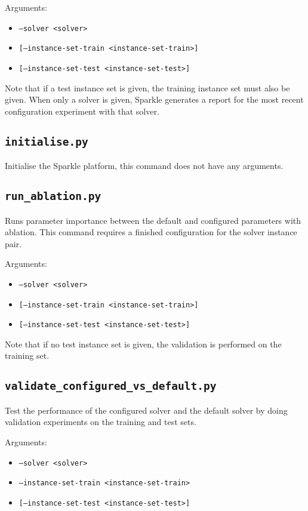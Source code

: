 \documentclass{article}
\begin{document}
Arguments:
\begin{itemize}[noitemsep]
  \item[] \texttt{--solver <solver>}
  \item[] \texttt{[--instance-set-train <instance-set-train>]}
  \item[] \texttt{[--instance-set-test <instance-set-test>]}
\end{itemize}

Note that if a test instance set is given, the training instance set must also be given. When only a solver is given, Sparkle generates a report for the most recent configuration experiment with that solver.

\subsection{\texttt{initialise.py}}
\label{cmd:initialise}

Initialise the Sparkle platform, this command does not have any arguments.

\subsection{\texttt{run\_ablation.py}}
\label{cmd:run_ablation}
Runs parameter importance between the default and configured parameters with ablation. This command requires a finished configuration for the solver instance pair.

Arguments:
\begin{itemize}[noitemsep]
  \item[] \texttt{--solver <solver>}
  \item[] \texttt{[--instance-set-train <instance-set-train>]}
  \item[] \texttt{[--instance-set-test <instance-set-test>]}
\end{itemize}

Note that if no test instance set is given, the validation is performed on the training set.


\subsection{\texttt{validate\_configured\_vs\_default.py}}
\label{cmd:validate_configured_vs_default}
Test the performance of the configured solver and the default solver by doing validation experiments on the training and test sets.

Arguments:
\begin{itemize}[noitemsep]
  \item[] \texttt{--solver <solver>}
  \item[] \texttt{--instance-set-train <instance-set-train>}
  \item[] \texttt{[--instance-set-test <instance-set-test>]}
\end{itemize}
\end{document}
